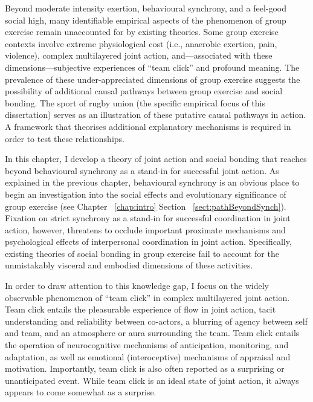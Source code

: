 \begin{CJK}{UTF8}{gbsn}
Beyond moderate intensity exertion, behavioural synchrony, and a feel-good social high, many identifiable empirical aspects of the phenomenon of group exercise remain unaccounted for by existing theories.  Some group exercise contexts involve extreme physiological cost (i.e., anaerobic exertion, pain, violence), complex multilayered joint action, and---associated with these dimensions---subjective experiences of ``team click'' and profound meaning.  The prevalence of these under-appreciated dimensions of group exercise suggests the possibility of additional causal pathways between group exercise and social bonding.  The sport of rugby union (the specific empirical focus of this dissertation) serves as an illustration of these putative causal pathways in action.  A framework that theorises additional explanatory mechanisms is required in order to test these relationships.

In this chapter, I develop a theory of joint action and social bonding that reaches beyond behavioural synchrony as a stand-in for successful joint action.  As explained in the previous chapter, behavioural synchrony is an obvious place to begin an investigation into the social effects and evolutionary significance of group exercise (see Chapter ~\ref{chap:intro} Section ~\ref{sect:pathBeyondSynch}). Fixation on strict synchrony as a stand-in for successful coordination in joint action, however, threatens to occlude important proximate mechanisms and psychological effects of interpersonal coordination in joint action.  Specifically, existing theories of social bonding in group exercise fail to account for the unmistakably visceral and embodied dimensions of these activities.

In order to draw attention to this knowledge gap,  I focus on the widely observable phenomenon of ``team
click'' in complex multilayered joint action.  Team click entails the pleasurable experience of flow in joint action, tacit understanding and reliability between co-actors, a blurring of agency between self and team, and an atmosphere or aura surrounding the team.  Team click entails the operation of neurocognitive mechanisms of anticipation, monitoring, and adaptation, as well as emotional (interoceptive) mechanisms of appraisal and motivation.  Importantly, team click is also often reported as a surprising or unanticipated event. While team click is an ideal state of joint action, it always appears to come somewhat as a surprise.


\end{CJK}
